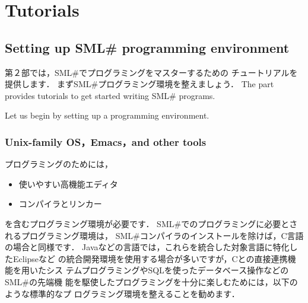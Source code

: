 \documentclass{jbook}
\newcommand{\txt}[2]{#2}
\newcommand{\smlsharp}{SML\#}
\begin{document}
\part{\txt{チュートリアル}{Tutorials}}
\label{part:tutorial}

\chapter{\txt{\smlsharp{}プログラミング環境の準備}
{Setting up \smlsharp{} programming environment}
}
\label{chap:tutorialEnvironment}

\ifx\jp%
	第２部では，\smlsharp{}でプログラミングをマスターするための
チュートリアルを提供します．
	まず\smlsharp{}プログラミング環境を整えましょう．
\else%
	The part~\ref{part:tutorial} provides tutorials to get started
writing \smlsharp{} programs.

	Let us begin by setting up a programming environment.
\fi%

\section{
\txt{Unix系OS，Emacsエディタ，その他ツールの整備}
    {Unix-family OS，Emacs，and other tools}}
\label{sec:tutorialEnvironmemt}
\ifx\jp%
	プログラミングのためには，
\begin{itemize}
\item 使いやすい高機能エディタ
\item コンパイラとリンカー
\end{itemize}
を含むプログラミング環境が必要です．
	\smlsharp{}でのプログラミングに必要とされるプログラミング環境は，
\smlsharp{}コンパイラのインストールを除けば，C言語の場合と同様です．
	Javaなどの言語では，これらを統合した対象言語に特化したEclipseなど
の統合開発環境を使用する場合が多いですが，Cとの直接連携機能を用いたシス
テムプログラミングやSQLを使ったデータベース操作などの\smlsharp{}の先端機
能を駆使したプログラミングを十分に楽しむためには，以下のような標準的なプ
ログラミング環境を整えることを勧めます．
\end{document}
